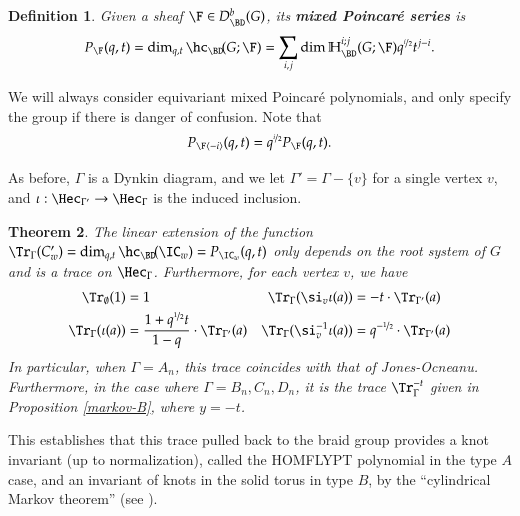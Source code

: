 \documentclass[12pt]{amsart}
\def\to{\rightarrow}
\newtheorem{thm}{Theorem}%
\newtheorem{defi}[thm]{Definition}
\theoremstyle{remark}
\begin{document}
\begin{defi} \label{defi-mPs}
Given a sheaf $\F \in D^b_{\BD}(G)$, its
  {\bf mixed Poincar\'e series} is
  \begin{equation*}
    P_{\F}(q,t)=\dim_{q,t}\hc_{\BD}\!(G;\F)=\sum_{i,j}\dim\mathbb{H}_{\BD}^{i;j}(G;\F)q^{\nicefrac{i}{2}}t^{j-i}.
  \end{equation*}
\end{defi}

We will always consider equivariant mixed Poincar\'e polynomials, and only specify the group if there is danger of confusion. Note that
\begin{equation} \label{shifttwist}
P_{\F\langle -i \rangle }(q,t) = q^{\nicefrac i2} P_{\F}(q,t).
\end{equation}

%

As before, $\Gamma$ is a Dynkin diagram, and we let
$\Gamma'=\Gamma-\{v\}$ for a single vertex $v$, and
$\iota:\Hec_{\Gamma'}\to \Hec_{\Gamma}$ is the induced inclusion.

\begin{thm}\label{main-theorem}
  The linear extension of the function
  $\Tr_\Gamma(C_w^{\prime})=\dim_{q,t}\hc_{\BD}\!(\IC_w) =
  P_{\IC_w}(q,t)$ only depends on the root system of $G$ and is a trace on
  $\Hec_{\Gamma}$. Furthermore, for each vertex $v$, we have
\begin{align*}
\label{norm1}  \Tr_{\emptyset}(1)&=1 &
\Tr_{\Gamma}(\si_{v}\iota(a))&= -t \cdot
\Tr_{\Gamma'}(a)\\ \Tr_{\Gamma}(\iota(a))&=\frac{1+ q^{\nicefrac 12}t}{1-q}\cdot
\Tr_{\Gamma'}(a) &
\Tr_{\Gamma}(\si_{v}^{-1}\iota(a))&=q^{- \nicefrac 12}\cdot \Tr_{\Gamma'}(a)
\end{align*}
In particular, when $\Gamma=A_n$, this trace coincides with that of
Jones-Ocneanu.  Furthermore, in the case where $\Gamma=B_n,C_n,D_n$,
it is the trace $\Tr_\Gamma^{-t}$ given in
Proposition \ref{markov-B}, where $y=-t$.
\end{thm}
This establishes that this trace pulled back to the braid group provides a knot invariant (up to normalization), called the HOMFLYPT
polynomial in the type $A$ case, and an invariant of knots in the
solid torus in type $B$, by the ``cylindrical Markov theorem'' (see \cite{GL}). 
\end{document}
